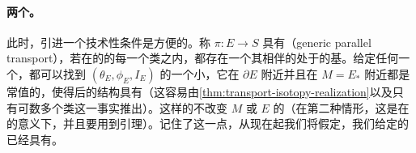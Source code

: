 \paragraph{两个\trFull\trEmbedding{}。}\label{sub:two-full-embeddings}
此时，引进一个技术性条件是方便的。称 $\pi\colon E\to S$ 具有\textbf{\trGeneric\trParallelTransport}（generic parallel transport），若在\trVanishingPath{}的\trDistinguishedBasis{}的每一个\trHomotopy{}类之内，都存在一个其相伴的\trVanishingCycle{}处于\trGeneralPosition{}的基。给定任何一个\trLefschetzFibration，都可以找到 $(\theta_E,\phi_E,I_E)$ 的一个小\trPerturbation，它在 $\partial E$ 附近并且在 $M=E_*$ 附近都是常值的，使得\trPerturbation{}后的结构具有\trGeneric\trParallelTransport（这容易由\cref{thm:transport-isotopy-realization}以及\trDistinguishedBasis{}只有可数多个\trHomotopy{}类这一事实推出）。这样的\trPerturbation{}不改变 $M$ 或 $E$ 的\trFukayaCategory（在第二种情形，这是在\trQuasiisomorphic{}的意义下，并且要用到\trMoser{}引理）。记住了这一点，从现在起我们将假定，我们给定的\trLefschetzFibration{}已经具有\trGeneric\trParallelTransport。

